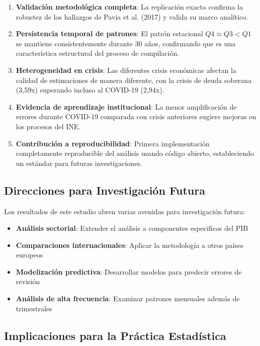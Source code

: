 \documentclass{article}
\begin{document}
\begin{enumerate}
\item \textbf{Validación metodológica completa}: La replicación exacta confirma la robustez de los hallazgos de Pavia et al. (2017) y valida su marco analítico.

\item \textbf{Persistencia temporal de patrones}: El patrón estacional $Q4 \approx Q3 < Q1$ se mantiene consistentemente durante 30 años, confirmando que es una característica estructural del proceso de compilación.

\item \textbf{Heterogeneidad en crisis}: Las diferentes crisis económicas afectan la calidad de estimaciones de manera diferente, con la crisis de deuda soberana (3,59x) superando incluso al COVID-19 (2,94x).

\item \textbf{Evidencia de aprendizaje institucional}: La menor amplificación de errores durante COVID-19 comparada con crisis anteriores sugiere mejoras en los procesos del INE.

\item \textbf{Contribución a reproducibilidad}: Primera implementación completamente reproducible del análisis usando código abierto, estableciendo un estándar para futuras investigaciones.
\end{enumerate}

\subsection{Direcciones para Investigación Futura}

Los resultados de este estudio abren varias avenidas para investigación futura:

\begin{itemize}
\item \textbf{Análisis sectorial}: Extender el análisis a componentes específicos del PIB
\item \textbf{Comparaciones internacionales}: Aplicar la metodología a otros países europeos
\item \textbf{Modelización predictiva}: Desarrollar modelos para predecir errores de revisión
\item \textbf{Análisis de alta frecuencia}: Examinar patrones mensuales además de trimestrales
\end{itemize}

\subsection{Implicaciones para la Práctica Estadística}
\end{document}
